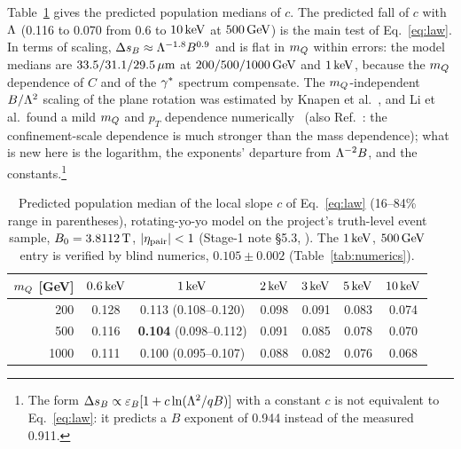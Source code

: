 Table~\ref{tab:c} gives the predicted population medians of $c$. The predicted fall of $c$ with $\Lam$ (0.116 to 0.070
from 0.6 to $10\keV$ at $500\GeV$) is the main test of Eq.~\eqref{eq:law}. In terms of scaling, $\DsB\approx
\Lam^{-1.8}B^{0.9}$ and is flat in $\mQ$ within errors: the model medians are $33.5/31.1/29.5\um$ at
$200/500/1000\GeV$ and $1\keV$, because the $\mQ$ dependence of $C$ and of the $\gst$ spectrum compensate. The
$\mQ$-independent $B/\Lam^2$ scaling of the plane rotation was estimated by Knapen et
al.~\cite[Eqs.~(8)--(9)]{Knapen:2017kly}, and Li et al.\ found a mild $\mQ$ and $p_T$ dependence
numerically~\cite[Sec.~V, Fig.~4]{Li:2020aoq} (also Ref.~\cite[Fig.~4]{Li:2019wce}: the confinement-scale
dependence is much stronger than the mass dependence); what is new here is the logarithm, the exponents' departure from
$\Lam^{-2}B$, and the constants.\footnote{The form $\DsB\propto\epsB[1+c\ln(\Lam^2/qB)]$ with a constant $c$ is not
equivalent to Eq.~\eqref{eq:law}: it predicts a $B$ exponent of 0.944 instead of the measured 0.911.}

\begin{table}[htbp]
\centering
\caption{Predicted population median of the local slope $c$ of Eq.~\eqref{eq:law} (16--84\% range in parentheses),
rotating-yo-yo model on the project's truth-level event sample, $B_0=3.8112\tesla$, $|\eta_{\rm pair}|<1$ (Stage-1
note \S5.3, ). The $1\keV$, $500\GeV$ entry is verified by blind numerics,
$0.105\pm0.002$ (Table~\ref{tab:numerics}).}
\label{tab:c}
\begin{tabular}{rcccccc}
\toprule
$\mQ$ [GeV] & $0.6\keV$ & $1\keV$ & $2\keV$ & $3\keV$ & $5\keV$ & $10\keV$\\
\midrule
200  & 0.128 & 0.113 (0.108--0.120) & 0.098 & 0.091 & 0.083 & 0.074\\
500  & 0.116 & \textbf{0.104} (0.098--0.112) & 0.091 & 0.085 & 0.078 & 0.070\\
1000 & 0.111 & 0.100 (0.095--0.107) & 0.088 & 0.082 & 0.076 & 0.068\\
\bottomrule
\end{tabular}
\end{table}


